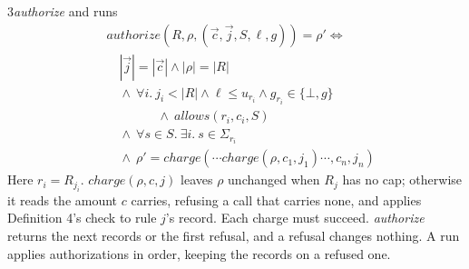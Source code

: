 \begin{perchdefinition}{3}{\emph{authorize} and runs}\label{def:authorize-and-runs}
\[\begin{aligned}&\mathit{authorize}(R, \rho, (\vec c, \vec j, S, \ell, g)) = \rho' \iff\\
&\quad |\vec j| = |\vec c| \land |\rho| = |R|\\
&\quad \land\ \forall i.\ j_i < |R| \land \ell \le u_{r_i} \land g_{r_i} \in \{\bot, g\}\\
&\qquad\qquad \land\ \mathit{allows}(r_i, c_i, S)\\
&\quad \land\ \forall s \in S.\ \exists i.\ s \in \Sigma_{r_i}\\
&\quad \land\ \rho' = \mathit{charge}(\cdots \mathit{charge}(\rho, c_1, j_1) \cdots, c_n, j_n)\end{aligned}\]
Here \(r_i = R_{j_i}\). \(\mathit{charge}(\rho, c, j)\) leaves \(\rho\) unchanged when \(R_j\) has no cap; otherwise it reads the amount \(c\) carries, refusing a call that carries none, and applies Definition 4's check to rule \(j\)'s record. Each charge must succeed. \emph{authorize} returns the next records or the first refusal, and a refusal changes nothing. A run applies authorizations in order, keeping the records on a refused one.
\end{perchdefinition}
